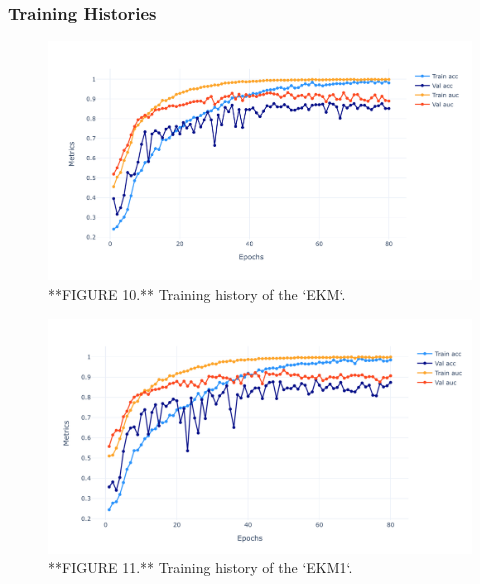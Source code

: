 \documentclass{acm_proc_article-sp}
\begin{document}
\hypertarget{training-histories}{%
\subsubsection{Training Histories}\label{training-histories}}

\begin{figure}

{\centering \includegraphics[width=20.25in]{Images/TrainingHistoryEKM} 

}

\caption{**FIGURE 10.** Training history of the `EKM`.}\label{fig:ekm-training}
\end{figure}
\begin{figure}

{\centering \includegraphics[width=19.81in]{Images/TrainingHistoryComparison} 

}

\caption{**FIGURE 11.** Training history of the `EKM1`.}\label{fig:ekm1-training}
\end{figure}
\end{document}
